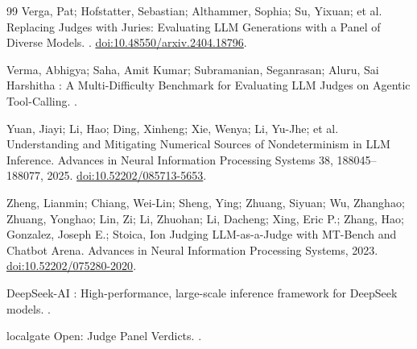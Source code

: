 \begin{thebibliography}{99}
Verga, Pat; Hofstatter, Sebastian; Althammer, Sophia; Su, Yixuan; et al.
\newblock Replacing Judges with Juries: Evaluating {LLM} Generations with a Panel of Diverse Models.
. \href{https://doi.org/10.48550/arxiv.2404.18796}{doi:10.48550/arxiv.2404.18796}.

Verma, Abhigya; Saha, Amit Kumar; Subramanian, Seganrasan; Aluru, Sai Harshitha
: A Multi-Difficulty Benchmark for Evaluating {LLM} Judges on Agentic Tool-Calling.
.

Yuan, Jiayi; Li, Hao; Ding, Xinheng; Xie, Wenya; Li, Yu-Jhe; et al.
\newblock Understanding and Mitigating Numerical Sources of Nondeterminism in {LLM} Inference.
\newblock Advances in Neural Information Processing Systems 38, 188045--188077, 2025. \href{https://doi.org/10.52202/085713-5653}{doi:10.52202/085713-5653}.

Zheng, Lianmin; Chiang, Wei-Lin; Sheng, Ying; Zhuang, Siyuan; Wu, Zhanghao; Zhuang, Yonghao; Lin, Zi; Li, Zhuohan; Li, Dacheng; Xing, Eric P.; Zhang, Hao; Gonzalez, Joseph E.; Stoica, Ion
\newblock Judging {LLM-as-a-Judge} with {MT-Bench} and {Chatbot Arena}.
\newblock Advances in Neural Information Processing Systems, 2023. \href{https://doi.org/10.52202/075280-2020}{doi:10.52202/075280-2020}.

{DeepSeek-AI}
: High-performance, large-scale inference framework for {DeepSeek} models.
.

{localgate}
 Open: Judge Panel Verdicts.
.

\end{thebibliography}
